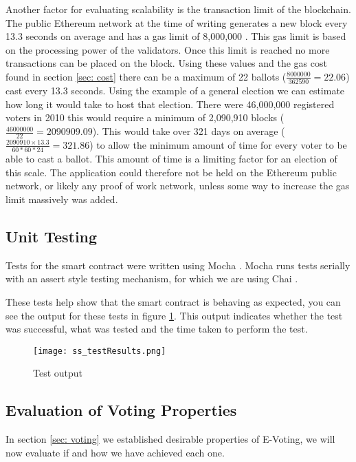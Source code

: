 \documentclass{entcs}
\begin{document}
Another factor for evaluating scalability is the transaction limit of the blockchain. The public Ethereum network at the time of writing generates a new block every 13.3 seconds on average \cite{ethscan} and has a gas limit of 8,000,000 \cite{gaslimit}. This gas limit is based on the processing power of the validators. Once this limit is reached no more transactions can be placed on the block. Using these values and the gas cost found in section \ref{sec: cost} there can be a maximum of 22 ballots (\(\frac{8000000}{362590}=22.06\)) cast every 13.3 seconds. Using the example of a general election we can estimate how long it would take to host that election. There were 46,000,000 registered voters in 2010 \cite{costOfGE} this would require a minimum of 2,090,910 blocks (\(\frac{46000000}{22}=2090909.09\)). This would take over 321 days on average (\(\frac{2090910 \times 13.3}{60*60*24}=321.86\)) to allow the minimum amount of time for every voter to be able to cast a ballot. This amount of time is a limiting factor for an election of this scale. The application could therefore not be held on the Ethereum public network, or likely any proof of work network, unless some way to increase the gas limit massively was added.

\subsection{Unit Testing} \label{sec: Unit}
Tests for the smart contract were written using Mocha \cite{mocha}. Mocha runs tests serially with an assert style testing mechanism, for which we are using Chai \cite{chai}.

These tests help show that the smart contract is behaving as expected, you can see the output for these tests in figure \ref{fig:testResults}. This output indicates whether the test was successful, what was tested and the time taken to perform the test.

\begin{figure}[h!]
    \centering
    \texttt{[image: ss\_testResults.png]}
    \caption{Test output}
    \label{fig:testResults}
\end{figure}




\subsection{Evaluation of Voting Properties}\label{sec: Eval}
In section \ref{sec: voting} we established desirable properties of E-Voting, we will now evaluate if and how we have achieved each one.
\end{document}
